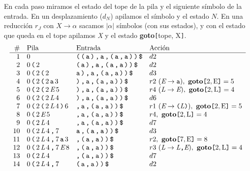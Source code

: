 \documentclass[12pt,letterpaper]{article}
\newcommand{\nt}[1]{\textit{#1}}
\newcommand{\tk}[1]{\texttt{#1}}
\newcommand{\tx}[1]{\text{#1}}
\begin{document}
\begin{enumerate}[label=\arabic*.]
  En cada paso miramos el estado del tope de la pila y el siguiente símbolo de la entrada. En un
  desplazamiento ($d_N$) apilamos el símbolo y el estado $N$. En una reducción $r_J$ con $\nt{X}\to\alpha$
  sacamos $|\alpha|$ símbolos (con sus estados), y con el estado que queda en el tope apilamos \nt{X} y el
  estado \textbf{goto}\tk{[}tope, X\tk{]}.
  {\small
  \[
  \begin{array}{r l l l}
    \# & \text{Pila} & \text{Entrada} & \text{Acción} \\ \hline
    1  & 0 & \tk{(\,(\,a\,)\,,\,a\,,\,(\,a\,,\,a\,)\,)\,\$} & d2 \\
    2  & 0\,\tk{(}\,2 & \tk{(\,a\,)\,,\,a\,,\,(\,a\,,\,a\,)\,)\,\$} & d2 \\
    3  & 0\,\tk{(}\,2\,\tk{(}\,2 & \tk{a\,)\,,\,a\,,\,(\,a\,,\,a\,)\,)\,\$} & d3 \\
    4  & 0\,\tk{(}\,2\,\tk{(}\,2\,\tk{a}\,3 & \tk{)\,,\,a\,,\,(\,a\,,\,a\,)\,)\,\$} & r2\ (\nt{E}\to\tk{a}),\ \textbf{goto}\tk{[}2,\tx{E}\tk{]}=5 \\
    5  & 0\,\tk{(}\,2\,\tk{(}\,2\,\nt{E}\,5 & \tk{)\,,\,a\,,\,(\,a\,,\,a\,)\,)\,\$} & r4\ (\nt{L}\to\nt{E}),\ \textbf{goto}\tk{[}2,\tx{L}\tk{]}=4 \\
    6  & 0\,\tk{(}\,2\,\tk{(}\,2\,\nt{L}\,4 & \tk{)\,,\,a\,,\,(\,a\,,\,a\,)\,)\,\$} & d6 \\
    7  & 0\,\tk{(}\,2\,\tk{(}\,2\,\nt{L}\,4\,\tk{)}\,6 & \tk{,\,a\,,\,(\,a\,,\,a\,)\,)\,\$} & r1\ (\nt{E}\to\tk{(}\nt{L}\tk{)}),\ \textbf{goto}\tk{[}2,\tx{E}\tk{]}=5 \\
    8  & 0\,\tk{(}\,2\,\nt{E}\,5 & \tk{,\,a\,,\,(\,a\,,\,a\,)\,)\,\$} & r4,\ \textbf{goto}\tk{[}2,\tx{L}\tk{]}=4 \\
    9  & 0\,\tk{(}\,2\,\nt{L}\,4 & \tk{,\,a\,,\,(\,a\,,\,a\,)\,)\,\$} & d7 \\
    10 & 0\,\tk{(}\,2\,\nt{L}\,4\,\tk{,}\,7 & \tk{a\,,\,(\,a\,,\,a\,)\,)\,\$} & d3 \\
    11 & 0\,\tk{(}\,2\,\nt{L}\,4\,\tk{,}\,7\,\tk{a}\,3 & \tk{,\,(\,a\,,\,a\,)\,)\,\$} & r2,\ \textbf{goto}\tk{[}7,\tx{E}\tk{]}=8 \\
    12 & 0\,\tk{(}\,2\,\nt{L}\,4\,\tk{,}\,7\,\nt{E}\,8 & \tk{,\,(\,a\,,\,a\,)\,)\,\$} & r3\ (\nt{L}\to\nt{L}\tk{,}\nt{E}),\ \textbf{goto}\tk{[}2,\tx{L}\tk{]}=4 \\
    13 & 0\,\tk{(}\,2\,\nt{L}\,4 & \tk{,\,(\,a\,,\,a\,)\,)\,\$} & d7 \\
    14 & 0\,\tk{(}\,2\,\nt{L}\,4\,\tk{,}\,7 & \tk{(\,a\,,\,a\,)\,)\,\$} & d2 \\

\end{array}\]}
\end{enumerate}
\end{document}
